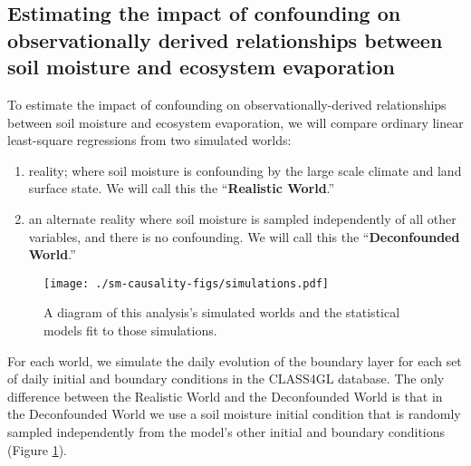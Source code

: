 \subsection{Estimating the impact of confounding on observationally derived relationships between soil moisture and ecosystem evaporation}
\label{sec:estim-impact-conf}

To estimate the impact of confounding on observationally-derived
relationships between soil moisture and ecosystem evaporation, we will
compare ordinary linear least-square regressions from two simulated
worlds:

\begin{enumerate}
  \item reality; where soil moisture is confounding by the large scale
    climate and land surface state. We will call this the
    ``\textbf{Realistic World}.''

  \item an alternate reality where soil moisture is sampled
    independently of all other variables, and there is no
    confounding. We will call this the ``\textbf{Deconfounded
      World}.''
\end{enumerate}

\begin{figure}
  \texttt{[image: ./sm-causality-figs/simulations.pdf]}
  \caption{A diagram of this analysis's simulated worlds and the
    statistical models fit to those
    simulations.}\label{fig:simulations}
\end{figure}

For each world, we simulate the daily evolution of the boundary layer
for each set of daily initial and boundary conditions in the CLASS4GL
database. The only difference between the Realistic World and the
Deconfounded World is that in the Deconfounded World we use a soil
moisture initial condition that is randomly sampled independently from
the model's other initial and boundary conditions (Figure
\ref{fig:simulations}).

